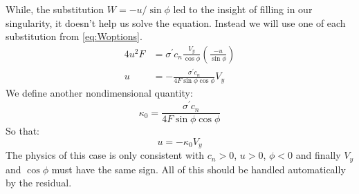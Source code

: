 \documentclass{article}
\begin{document}
While, the substitution $W = -u/\sin\phi$ led to the insight of filling in our singularity, it doesn't help us solve the equation.  Instead we will use one of each substitution from \cref{eq:Woptions}.  
\begin{equation}
\begin{aligned}
4 u^2 F&= \sigma^\prime c_n \frac{V_y}{\cos\phi} \left(\frac{-u}{\sin\phi}\right)\\
u &= -\frac{\sigma^\prime c_n}{4 F \sin\phi \cos\phi} V_y
\end{aligned}
\end{equation}
We define another nondimensional quantity:
\begin{equation}
\kappa_0 = \frac{\sigma^\prime c_n}{4 F \sin\phi\cos\phi}
\end{equation}
So that:
\begin{equation}
u = -\kappa_0 V_y
\end{equation}
The physics of this case is only consistent with $c_n > 0$, $u > 0$, $\phi < 0$ and finally $V_y$ and $\cos\phi$ must have the same sign.  All of this should be handled automatically by the residual. 
\end{document}
